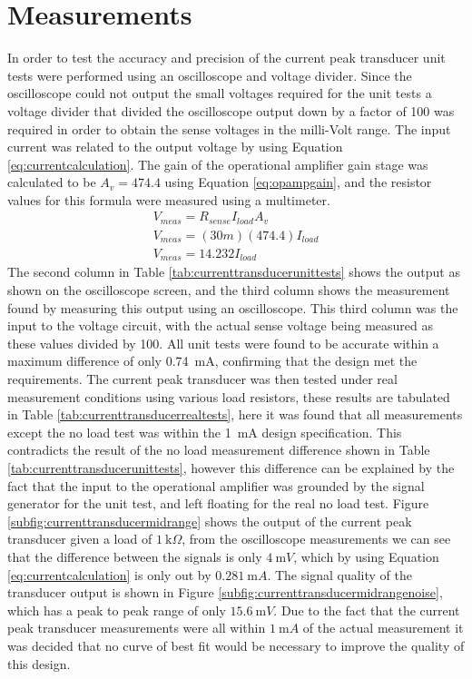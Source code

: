 \hspace{5mm}
\section{Measurements} \label{sec:measurements_current_peak_transducer}
In order to test the accuracy and precision of the current peak transducer unit tests were performed using an oscilloscope and voltage divider. Since the oscilloscope could not output the small voltages required for the unit tests a voltage divider that divided the oscilloscope output down by a factor of 100 was required in order to obtain the sense voltages in the milli-Volt range. The input current was related to the output voltage by using Equation \ref{eq:currentcalculation}. The gain of the operational amplifier gain stage was calculated to be $A_{v}=474.4$ using Equation \ref{eq:opampgain}, and the resistor values for this formula were measured using a multimeter.
\begin{align}
    V_{meas}=R_{sense}I_{load}A_{v} \nonumber\\
    V_{meas}=(30m)(474.4)I_{load} \nonumber \\
    V_{meas}= 14.232I_{load} \label{eq:currentcalculation}
\end{align} 
The second column in Table \ref{tab:currenttransducerunittests} shows the output as shown on the oscilloscope screen, and the third column shows the measurement found by measuring this output using an oscilloscope. This third column was the input to the voltage circuit, with the actual sense voltage being measured as these values divided by 100. All unit tests were found to be accurate within a maximum difference of only \SI{0.74}{\milli A}, confirming that the design met the requirements. \vspace{4mm} \newline 
The current peak transducer was then tested under real measurement conditions using various load resistors, these results are tabulated in Table \ref{tab:currenttransducerrealtests}, here it was found that all measurements except the no load test was within the \SI{1}{\milli A} design specification. This contradicts the result of the no load measurement difference shown in Table \ref{tab:currenttransducerunittests}, however this difference can be explained by the fact that the input to the operational amplifier was grounded by the signal generator for the unit test, and left floating for the real no load test. \vspace{4mm} \newline  
Figure \ref{subfig:currenttransducermidrange} shows the output of the current peak transducer given a load of  $\SI{1}{\kilo \Omega}$, from the oscilloscope measurements we can see that the difference between the signals is only $\SI{4}{\milli V}$, which by using Equation \ref{eq:currentcalculation} is only out by $\SI{0.281}{\milli A}$. The signal quality of the transducer output is shown in Figure \ref{subfig:currenttransducermidrangenoise}, which has a peak to peak range of only $\SI{15.6}{\milli V}$. Due to the fact that the current peak transducer measurements were all within $\SI{1}{\milli A}$ of the actual measurement it was decided that no curve of best fit would be necessary to improve the quality of this design.

